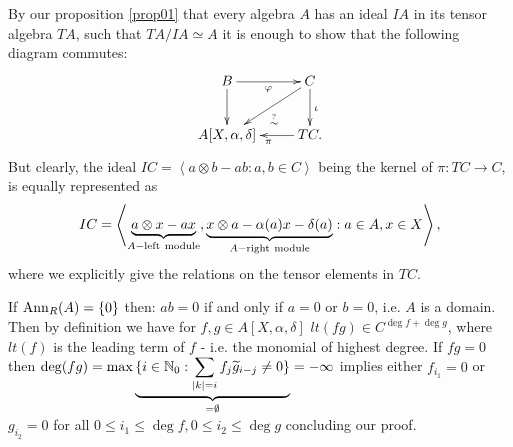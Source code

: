 \en
\ed
\item By our proposition \ref{prop01} that every algebra $A$ has an ideal $IA$ in its tensor algebra $TA$, such that $TA/IA \simeq A$ it is enough to show that the following diagram commutes:
$$\xymatrix{
B \ar[d]\ar[r]_\varphi & C\ar[ld]^{\stackrel{?}{\sim}}\ar[d]^\iota\\
A[X,\alpha,\delta]& T C \ar[l]^\pi.\\
}$$
But clearly, the ideal $I C = \left<a \otimes b - a b : a, b \in C\right>$ being the kernel of $\pi : TC \longrightarrow C$, is equally represented as
$$I C = \left<\underbrace{a \otimes x - a x}_{A-\trm{left}\ \trm{module}}, \underbrace{x \otimes a - \alpha(a) x - \delta(a)}_{A-\trm{right}\ \trm{module}} : a \in A, x \in X\right>,$$
where we explicitly give the relations on the tensor elements in $T C$.
\item If $\mathrm{Ann}_R(A) = \{0\}$ then: $a b = 0$ if and only if $a = 0$ or $b = 0$, i.e. $A$ is a domain. Then by definition we have for $f, g \in A[X,\alpha,\delta]$ $lt(f g) \in C^{\deg f + \deg g}$, where $lt(f)$ is the leading term of $f$ - i.e. the monomial of highest degree. If $f g = 0$ then $\deg (f g) = \max \underbrace{\{i \in \mathbb{N}_0 : \sum_{|k| = i} f_j \widetilde{g}_{i-j} \neq 0\}}_{= \emptyset} = -\infty$ implies either $f_{i_1} = 0$ or $g_{i_2} = 0$ for all $0 \leq i_1 \leq \deg f, 0 \leq i_2 \leq \deg g$ concluding our proof.

